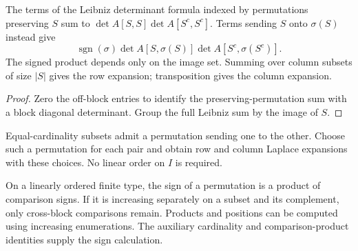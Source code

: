 \begin{lemma}

\label{lem:laplace-group}


\leanok

The terms of the Leibniz determinant formula indexed by permutations preserving $S$
sum to $\det A[S,S]\det A[S^c,S^c]$. Terms sending $S$ onto $\sigma(S)$ instead give
\[ \operatorname{sgn}(\sigma)
 \det A[S,\sigma(S)]\det A[S^c,\sigma(S^c)]. \]
The signed product depends only on the image set. Summing over column subsets of size
$|S|$ gives the row expansion; transposition gives the column expansion.

\end{lemma}

\begin{proof}

\leanok

Zero the off-block entries to identify the preserving-permutation sum with a block
diagonal determinant. Group the full Leibniz sum by the image of $S$.

\end{proof}

\begin{definition}

\label{def:laplace-perm}


\leanok


Equal-cardinality subsets admit a permutation sending one to the other.
Choose such a permutation for each pair and obtain row and column Laplace expansions
with these choices. No linear order on $I$ is required.

\end{definition}

\begin{lemma}

\label{lem:shuffle-sign}


\leanok

On a linearly ordered finite type, the sign of a permutation is a product of comparison
signs. If it is increasing separately on a subset and its complement, only cross-block
comparisons remain. Products and positions can be computed using increasing enumerations.
The auxiliary cardinality and comparison-product identities supply the sign calculation.

\end{lemma}

